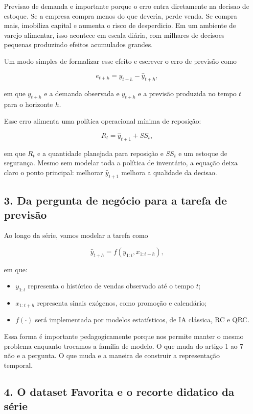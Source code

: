 \documentclass[12pt]{article}
\providecommand{\tightlist}{%
          \setlength{\itemsep}{0pt}\setlength{\parskip}{0pt}}
\begin{document}
Previsao de demanda e importante porque o erro entra diretamente na decisao de estoque. Se a empresa compra menos do que deveria, perde venda. Se compra mais, imobiliza capital e aumenta o risco de desperdicio. Em um ambiente de varejo alimentar, isso acontece em escala diária, com milhares de decisoes pequenas produzindo efeitos acumulados grandes.

Um modo simples de formalizar esse efeito e escrever o erro de previsão como

\[
e_{t+h} = y_{t+h} - \hat{y}_{t+h},
\]

em que \(y_{t+h}\) e a demanda observada e \(\hat{y}_{t+h}\) e a previsão produzida no tempo \(t\) para o horizonte \(h\).

Esse erro alimenta uma política operacional mínima de reposição:

\[
R_t = \hat{y}_{t+1} + SS_t,
\]

em que \(R_t\) e a quantidade planejada para reposição e \(SS_t\) e um estoque de segurança. Mesmo sem modelar toda a política de inventário, a equação deixa claro o ponto principal: melhorar \(\hat{y}_{t+1}\) melhora a qualidade da decisao.

\subsection{3. Da pergunta de negócio para a tarefa de previsão}\label{3-da-pergunta-de-neguxf3cio-para-a-tarefa-de-previsuxe3o}

Ao longo da série, vamos modelar a tarefa como

\[
\hat{y}_{t+h} = f(y_{1:t}, x_{1:t+h}),
\]

em que:

\begin{itemize}
\tightlist
\item
  \(y_{1:t}\) representa o histórico de vendas observado até o tempo \(t\);
\item
  \(x_{1:t+h}\) representa sinais exógenos, como promoção e calendário;
\item
  \(f(\cdot)\) será implementada por modelos estatísticos, de IA clássica, RC e QRC.
\end{itemize}

Essa forma é importante pedagogicamente porque nos permite manter o mesmo problema enquanto trocamos a família de modelo. O que muda do artigo 1 ao 7 não e a pergunta. O que muda e a maneira de construir a representação temporal.

\subsection{4. O dataset Favorita e o recorte didatico da série}\label{4-o-dataset-favorita-e-o-recorte-didatico-da-suxe9rie}
\end{document}

